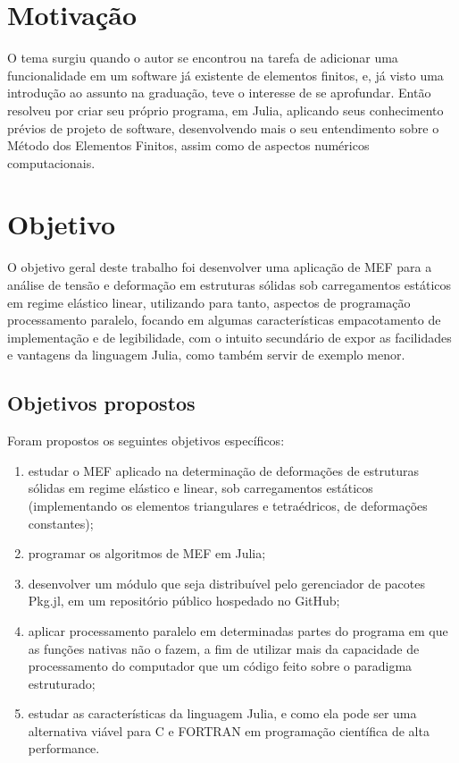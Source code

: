 \section{Motivação}

O tema surgiu quando o autor se encontrou na tarefa de adicionar uma funcionalidade em um software já existente de elementos finitos, e, já visto uma introdução ao assunto na graduação, teve o interesse de se aprofundar. Então resolveu por criar seu próprio programa, em Julia, aplicando seus conhecimento prévios de projeto de software, desenvolvendo mais o seu entendimento sobre o Método dos Elementos Finitos, assim como de aspectos numéricos computacionais.


\section{Objetivo}

O objetivo geral deste trabalho foi desenvolver uma aplicação de MEF para a análise de tensão e deformação em estruturas sólidas sob carregamentos estáticos em regime elástico linear, utilizando para tanto, aspectos de programação processamento paralelo, focando em algumas características empacotamento de implementação e de legibilidade, com o intuito secundário de expor as facilidades e vantagens da linguagem Julia, como também servir de exemplo menor.

\subsection{Objetivos propostos}

Foram propostos os seguintes objetivos específicos:

\begin{enumerate}
    \item estudar o MEF aplicado na determinação de deformações de estruturas sólidas em regime elástico e linear, sob carregamentos estáticos (implementando os elementos triangulares e tetraédricos, de deformações constantes);
    \item programar os algoritmos de MEF em Julia;
    \item desenvolver um módulo que seja distribuível pelo gerenciador de pacotes Pkg.jl, em um repositório público hospedado no GitHub;
    \item aplicar processamento paralelo em determinadas partes do programa em que as funções nativas não o fazem, a fim de utilizar mais da capacidade de processamento do computador que um código feito sobre o paradigma estruturado;
    \item estudar as características da linguagem Julia, e como ela pode ser uma alternativa viável para C e FORTRAN em programação científica de alta performance.
\end{enumerate}

